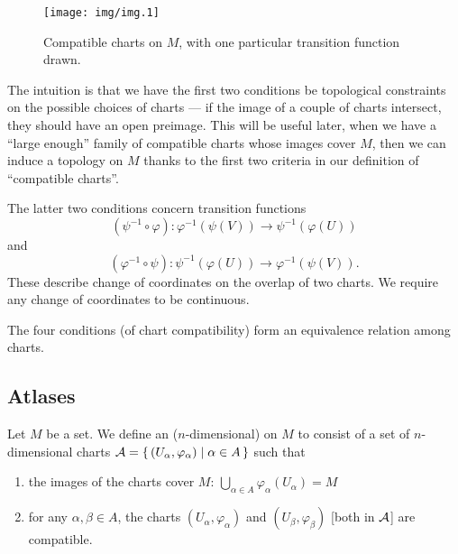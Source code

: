\begin{figure}[H]
  \centering
  \texttt{[image: img/img.1]}
  \caption{Compatible charts on $M$, with one particular transition function drawn.}\label{fig:chart:compatibility}
\end{figure}

\begin{remark}
The intuition is that we have the first two conditions be topological
constraints on the possible choices of charts --- if the image of a
couple of charts intersect, they should have an open preimage.
This will be useful later, when we have a ``large enough'' family of
compatible charts whose images cover $M$, then we can induce a topology
on $M$ thanks to the first two criteria in our definition of
``compatible charts''.
\end{remark}

\begin{remark}
The latter two conditions concern transition functions
\begin{equation*}
(\psi^{-1}\circ\varphi)\colon\varphi^{-1}\left(\psi(V)\right)\to\psi^{-1}\left(\varphi(U)\right)
\end{equation*}
and
\begin{equation*}
(\varphi^{-1}\circ\psi)\colon\psi^{-1}\left(\varphi(U)\right)\to\varphi^{-1}\left(\psi(V)\right).
\end{equation*}
These describe change of coordinates on the overlap of two charts.
We require any change of coordinates to be continuous.
\end{remark}

\begin{remark}
The four conditions (of chart compatibility) form an equivalence relation
among charts.
\end{remark}

\subsection{Atlases}

\begin{definition}
Let $M$ be a set. We define an ($n$-dimensional)  on $M$
to consist of a set of $n$-dimensional charts
$\mathcal{A}=\{\,(U_{\alpha},\varphi_{\alpha})\mid\alpha\in A\,\}$
such that
\begin{enumerate}
\item the images of the charts cover $M$: $\displaystyle\bigcup_{\alpha\in{A}}\varphi_{\alpha}(U_{\alpha})=M$
\item for any $\alpha,\beta\in A$, the charts
  $(U_{\alpha},\varphi_{\alpha})$ and $(U_{\beta},\varphi_{\beta})$
  [both in $\mathcal{A}$] are compatible.
\end{enumerate}
\end{definition}

